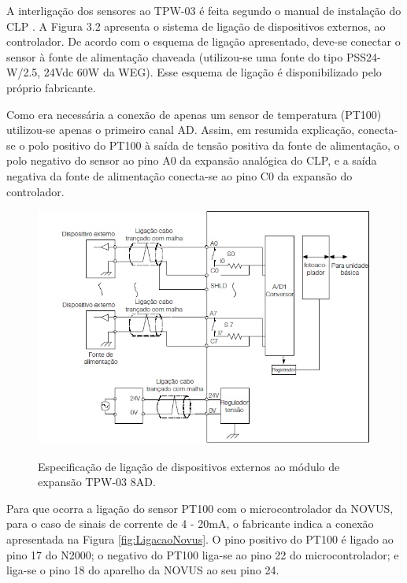 A interligação dos sensores ao TPW-03 é feita segundo o manual de instalação do CLP \cite{weg2010manualinstalacao}. A Figura 3.2 apresenta o sistema de ligação de dispositivos externos, ao controlador. De acordo com o esquema de ligação apresentado, deve-se conectar o sensor à fonte de alimentação chaveada (utilizou-se uma fonte do tipo PSS24-W/2.5, 24Vdc 60W da WEG). Esse esquema de ligação é disponibilizado pelo próprio fabricante.

Como era necessária a conexão de apenas um sensor de temperatura (PT100) utilizou-se apenas o primeiro canal AD. Assim, em resumida explicação, conecta-se o polo positivo do PT100 à saída de tensão positiva da fonte de alimentação, o polo negativo do sensor ao pino A0 da expansão analógica do CLP, e a saída negativa da fonte de alimentação conecta-se ao pino C0 da expansão do controlador.

\begin{figure}[h!]
\centering
\includegraphics[scale=0.9]{Ligacao.jpg}
\label{fig:LigacaoAnalogico}
\caption{Especificação de ligação de dispositivos externos ao módulo de expansão TPW-03 8AD.}
\end{figure}


Para que ocorra a ligação do sensor PT100 com o microcontrolador da NOVUS, para o caso de sinais de corrente de 4 - 20mA, o fabricante indica a conexão apresentada na Figura \ref{fig:LigacaoNovus}. O pino positivo do PT100 é ligado ao pino 17 do N2000; o negativo do PT100 liga-se ao pino 22 do microcontrolador; e liga-se o pino 18 do aparelho da NOVUS ao seu pino 24.

